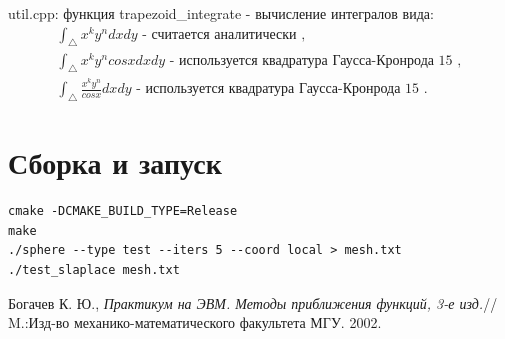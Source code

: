 \documentclass[a4paper,article]{article}
\begin{document}
util.cpp: функция trapezoid\_integrate - вычисление интегралов вида:
\begin{equation*}
\begin{split}
\int_\bigtriangleup x^k y^n dx dy\text { - считается аналитически }, \\
\int_\bigtriangleup x^k y^n cos x dx dy\text{ - используется квадратура Гаусса-Кронрода 15 } ,\\
\int_\bigtriangleup \frac{x^k y^n}{cos x} dx dy\text{ - используется квадратура Гаусса-Кронрода 15 }.
\end{split}
\end{equation*}

\section{Сборка и запуск}
\begin{verbatim}
cmake -DCMAKE_BUILD_TYPE=Release
make
./sphere --type test --iters 5 --coord local > mesh.txt
./test_slaplace mesh.txt
\end{verbatim}

\begin{thebibliography}{999}
 Богачев К. Ю., {\it  Практикум на ЭВМ.  Методы
    приближения функций, 3-е изд.}// M.:Изд-во
  механико-математического факультета МГУ. 2002.

\end{thebibliography}
\end{document}
